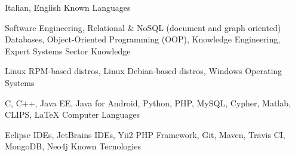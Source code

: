

\begin{cventries}

  \cventry
    {Italian, English}
    {Known Languages}
    {}
    {}
    {}

  \cventry
    {Software Engineering, Relational \& NoSQL (document and graph oriented) Databases, Object-Oriented Programming (OOP), Knowledge Engineering, Expert Systems}
    {Sector Knowledge}
    {}
    {}
    {}

  \cventry
    {Linux RPM-based distros, Linux Debian-based distros, Windows}
    {Operating Systems}
    {}
    {}
    {}

  \cventry
    {C, C++, Java EE, Java for Android, Python, PHP, MySQL, Cypher, Matlab, CLIPS, LaTeX}
    {Computer Languages}
    {}
    {}
    {}

  \cventry
    {Eclipse IDEs, JetBrains IDEs, Yii2 PHP Framework, Git, Maven, Travis CI, MongoDB, Neo4j}
    {Known Tecnologies}
    {}
    {}
    {}

\end{cventries}


